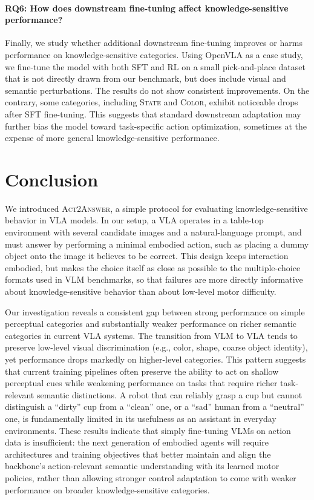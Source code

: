 \documentclass{llmxive}
\begin{document}
\paragraph{RQ6: How does downstream fine-tuning affect knowledge-sensitive performance?}
Finally, we study whether additional downstream fine-tuning improves or harms performance on knowledge-sensitive categories. Using OpenVLA as a case study, we fine-tune the model with both SFT and RL on a small pick-and-place dataset that is not directly drawn from our benchmark, but does include visual and semantic perturbations. The results do not show consistent improvements. On the contrary, some categories, including \textsc{State} and \textsc{Color}, exhibit noticeable drops after SFT fine-tuning. This suggests that standard downstream adaptation may further bias the model toward task-specific action optimization, sometimes at the expense of more general knowledge-sensitive performance.

\section{Conclusion}

We introduced \textsc{Act2Answer}, a simple protocol for evaluating knowledge-sensitive behavior in VLA models.
In our setup, a VLA operates in a table-top environment with several candidate images and a natural-language prompt, and must answer by performing a minimal embodied action, such as placing a dummy object onto the image it believes to be correct.
This design keeps interaction embodied, but makes the choice itself as close as possible to the multiple-choice formats used in VLM benchmarks, so that failures are more directly informative about knowledge-sensitive behavior than about low-level motor difficulty.

Our investigation reveals a consistent gap between strong performance on simple perceptual categories and substantially weaker performance on richer semantic categories in current VLA systems.
The transition from VLM to VLA tends to preserve low-level visual discrimination (e.g., color, shape, coarse object identity), yet performance drops markedly on higher-level categories.
This pattern suggests that current training pipelines often preserve the ability to act on shallow perceptual cues while weakening performance on tasks that require richer task-relevant semantic distinctions.
A robot that can reliably grasp a cup but cannot distinguish a ``dirty'' cup from a ``clean'' one, or a ``sad'' human from a ``neutral'' one, is fundamentally limited in its usefulness as an assistant in everyday environments.
These results indicate that simply fine-tuning VLMs on action data is insufficient: the next generation of embodied agents will require architectures and training objectives that better maintain and align the backbone’s action-relevant semantic understanding with its learned motor policies, rather than allowing stronger control adaptation to come with weaker performance on broader knowledge-sensitive categories.
\end{document}
